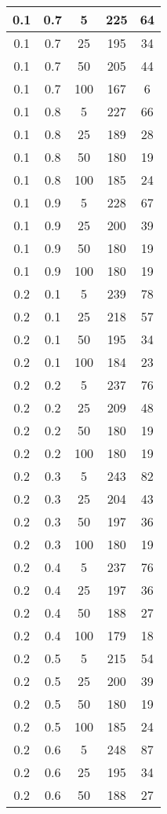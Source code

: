 \begin{appendices}
\begin{center}
\begin{longtable}[c]{|c|c|c|c|c|}
		\hline
		0.1& 0.7& 5& 225&  64\\
		\hline
		0.1& 0.7& 25& 195&  34\\
		\hline
		0.1& 0.7& 50& 205&  44\\
		\hline
		0.1& 0.7& 100& 167&  6\\
		\hline
		0.1& 0.8& 5& 227&  66\\
		\hline
		0.1& 0.8& 25& 189&  28\\
		\hline
		0.1& 0.8& 50& 180&  19\\
		\hline
		0.1& 0.8& 100& 185&  24\\
		\hline
		0.1& 0.9& 5& 228&  67\\
		\hline
		0.1& 0.9& 25& 200&  39\\
		\hline
		0.1& 0.9& 50& 180&  19\\
		\hline
		0.1& 0.9& 100& 180&  19\\
		\hline
		0.2& 0.1& 5& 239&  78\\
		\hline
		0.2& 0.1& 25& 218&  57\\
		\hline
		0.2& 0.1& 50& 195&  34\\
		\hline
		0.2& 0.1& 100& 184&  23\\
		\hline
		0.2& 0.2& 5& 237&  76\\
		\hline
		0.2& 0.2& 25& 209&  48\\
		\hline
		0.2& 0.2& 50& 180&  19\\
		\hline
		0.2& 0.2& 100& 180&  19\\
		\hline
		0.2& 0.3& 5& 243&  82\\
		\hline
		0.2& 0.3& 25& 204&  43\\
		\hline
		0.2& 0.3& 50& 197&  36\\
		\hline
		0.2& 0.3& 100& 180&  19\\
		\hline
		0.2& 0.4& 5& 237&  76\\
		\hline
		0.2& 0.4& 25& 197&  36\\
		\hline
		0.2& 0.4& 50& 188&  27\\
		\hline
		0.2& 0.4& 100& 179&  18\\
		\hline
		0.2& 0.5& 5& 215&  54\\
		\hline
		0.2& 0.5& 25& 200&  39\\
		\hline
		0.2& 0.5& 50& 180&  19\\
		\hline
		0.2& 0.5& 100& 185&  24\\
		\hline
		0.2& 0.6& 5& 248&  87\\
		\hline
		0.2& 0.6& 25& 195&  34\\
		\hline
		0.2& 0.6& 50& 188&  27\\

\end{longtable}
\end{center}
\end{appendices}
